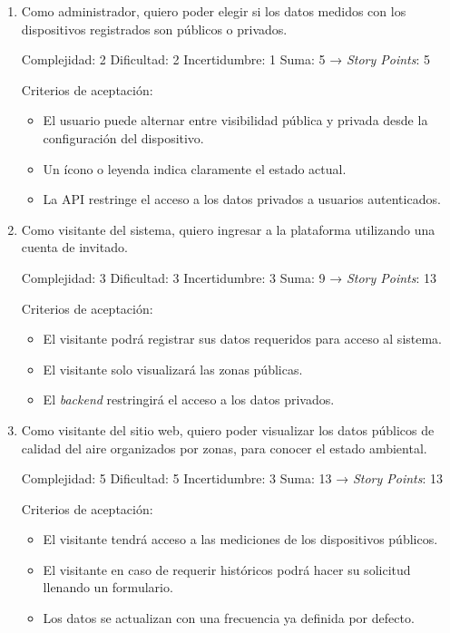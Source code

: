 \documentclass[
11pt, %
]{charter}
\begin{document}
\begin{enumerate}
	\item Como administrador, quiero poder elegir si los datos medidos con los dispositivos registrados son públicos o privados.

	Complejidad: 2
	Dificultad: 2
	Incertidumbre: 1
	Suma: 5 → \textit{Story Points}: 5

	Criterios de aceptación:
	\begin{itemize}
		\item El usuario puede alternar entre visibilidad pública y privada desde la configuración del dispositivo.
		\item Un ícono o leyenda indica claramente el estado actual.
		\item La API restringe el acceso a los datos privados a usuarios autenticados.

	\end{itemize}
	\item Como visitante del sistema, quiero ingresar a la plataforma utilizando una cuenta de invitado.

	Complejidad: 3
	Dificultad: 3
	Incertidumbre: 3
	Suma: 9 → \textit{Story Points}: 13

	Criterios de aceptación:
	\begin{itemize}
		\item El visitante podrá registrar sus datos requeridos para acceso al sistema.
		\item El visitante solo visualizará las zonas públicas.
		\item El \textit{backend} restringirá el acceso a los datos privados.
	\end{itemize}

	\item Como visitante del sitio web, quiero poder visualizar los datos públicos de calidad del aire organizados por zonas, para conocer el estado ambiental.

	Complejidad: 5
	Dificultad: 5
	Incertidumbre: 3
	Suma: 13 → \textit{Story Points}: 13

	Criterios de aceptación:
	\begin{itemize}
		\item El visitante tendrá acceso a las mediciones de los dispositivos públicos.
		\item El visitante en caso de requerir históricos podrá hacer su solicitud llenando un formulario.
		\item Los datos se actualizan con una frecuencia ya definida por defecto.
	\end{itemize}
\end{enumerate}
\end{document}

